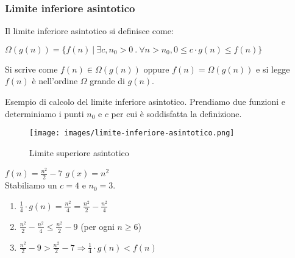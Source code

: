 \subsubsection{Limite inferiore asintotico}
\begin{definition}
Il limite inferiore asintotico si definisce come:
\begin{center}
    $\Omega(g(n)) = \{f(n) \: |\: \exists c, n_0 > 0 \: . \: \forall n > n_0, 0 \leq c \cdot g(n) \leq f(n) \}$
\end{center}
\end{definition}
\hspace{-15pt}Si scrive come $f(n) \in \Omega(g(n))$ oppure $f(n) = \Omega(g(n))$ e si legge $f(n)$ è nell'ordine $\Omega$ grande di $g(n)$.
\begin{example}
Esempio di calcolo del limite inferiore asintotico. Prendiamo due funzioni e determiniamo i punti $n_0$ e $c$ per cui è soddisfatta la definizione.
\end{example}
\begin{wrapfigure}[6]{r}{8cm}
    \vspace{-15pt}
    \centering
    \texttt{[image: images/limite-inferiore-asintotico.png]}
    \vspace{-5pt}
    \caption{Limite superiore asintotico}
\end{wrapfigure}

$f(n) = \frac{n^2}{2}-7$ \: \: \: $g(x)=n^2$\\
Stabiliamo un $c = 4$ e $n_0 = 3$.
\begin{enumerate}
    \item $\frac{1}{4} \cdot g(n) = \frac{n^2}{4} = \frac{n^2}{2} - \frac{n^2}{4}$
    \item $\frac{n^2}{2} - \frac{n^2}{4} \leq \frac{n^2}{2} - 9 $ (per ogni $n \geq 6$)
    \item $\frac{n^2}{2} - 9 > \frac{n^2}{2}-7 \Longrightarrow \frac{1}{4} \cdot g(n) < f(n)$
\end{enumerate}


